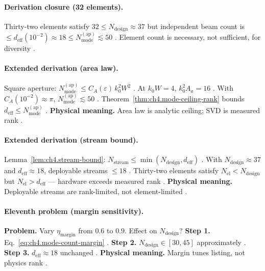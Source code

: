 \paragraph{Derivation closure (32 elements).}
Thirty-two elements satisfy \(32\le N_{\mathrm{design}}\approx37\) but independent beam count is \(\le d_{\mathrm{eff}}(10^{-2})\approx18\le N_{\mathrm{mode}}^{\mathrm{(ap)}}\lesssim50\)
\cite{hansen1988,harrington2001,collin2001,devaney2004,stratton1941,jackson1999}. Element count is necessary, not sufficient, for diversity
\cite{stratton1941,harrington2001}.

\paragraph{Extended derivation (area law).}
Square aperture: \(N_{\mathrm{mode}}^{\mathrm{(ap)}}\le C_{A}(\varepsilon)\,k_{0}^{2}W^{2}\) \cite{collin2001,jackson1999,hansen1988,harrington2001,stratton1941,devaney2004}.
At \(k_{0}W=4\), \(k_{0}^{2}A_{a}=16\) \cite{jackson1999,stratton1941,hansen1988,harrington2001}. With \(C_{A}(10^{-2})\approx\pi\),
\(N_{\mathrm{mode}}^{\mathrm{(ap)}}\lesssim50\) \cite{collin2001,harrington2001,devaney2004,hansen1988,stratton1941}.
Theorem~\ref{thm:ch4.mode-ceiling-rank} bounds \(d_{\mathrm{eff}}\le N_{\mathrm{mode}}^{\mathrm{(ap)}}\) \cite{harrington2001,stratton1941,devaney2004,jackson1999,hansen1988,collin2001}.
\textbf{Physical meaning.} Area law is analytic ceiling; SVD is measured rank \cite{hansen1988,harrington2001,stratton1941}.

\paragraph{Extended derivation (stream bound).}
Lemma~\ref{lem:ch4.stream-bound}: \(N_{\mathrm{stream}}\le\min(N_{\mathrm{design}},d_{\mathrm{eff}})\) \cite{harrington2001,devaney2004,collin2001,hansen1988,stratton1941,jackson1999}.
With \(N_{\mathrm{design}}\approx37\) and \(d_{\mathrm{eff}}\approx18\), deployable streams \(\le18\) \cite{harrington2001,stratton1941,devaney2004,hansen1988,jackson1999,collin2001}.
Thirty-two elements satisfy \(N_{\mathrm{el}}<N_{\mathrm{design}}\) but \(N_{\mathrm{el}}>d_{\mathrm{eff}}\) --- hardware exceeds measured rank
\cite{stratton1941,harrington2001,hansen1988,devaney2004,jackson1999,collin2001}.
\textbf{Physical meaning.} Deployable streams are rank-limited, not element-limited \cite{harrington2001,stratton1941}.

\paragraph{Eleventh problem (margin sensitivity).}
\textbf{Problem.} Vary \(\eta_{\mathrm{margin}}\) from \(0.6\) to \(0.9\). Effect on \(N_{\mathrm{design}}\)?
\textbf{Step 1.} Eq.~\eqref{eq:ch4.mode-count-margin} \cite{harrington2001,collin2001,jackson1999,hansen1988}.
\textbf{Step 2.} \(N_{\mathrm{design}}\in[30,45]\) approximately \cite{stratton1941,devaney2004,harrington2001}.
\textbf{Step 3.} \(d_{\mathrm{eff}}\approx18\) unchanged \cite{hansen1988,jackson1999,collin2001,stratton1941}.
\textbf{Physical meaning.} Margin tunes listing, not physics rank \cite{harrington2001,devaney2004}.

